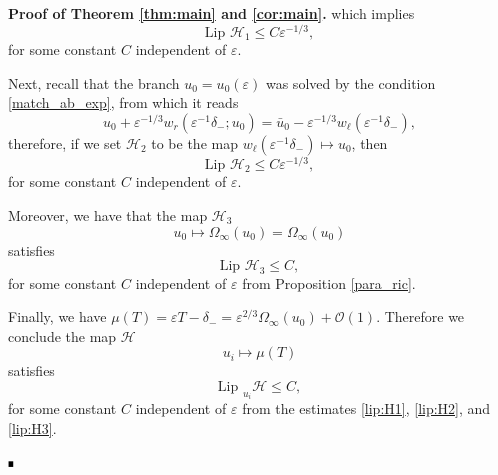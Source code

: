 \documentclass[letterpaper,11pt]{article}
\newcommand{\rmO}{\mathcal{O}}
\newcommand{\eps}{\varepsilon}
\numberwithin{equation}{section}
\theoremstyle{plain}
\newenvironment{Proof}[1][.]%
 {\begin{trivlist}\item[]\textbf{Proof#1 }}%
 {\hspace*{\fill}$\rule{0.3\baselineskip}{0.35\baselineskip}$\end{trivlist}}
\begin{document}
\begin{Proof}[\textbf{ of Theorem \ref{thm:main} and \ref{cor:main}}.]
which implies
\begin{equation}\label{lip:H1}
\text{Lip } \mathcal{H}_1 \le C\eps^{-1/3},
\end{equation}
for some constant $C$ independent of $\eps$.

Next, recall that the branch $u_0 = u_0(\eps)$ was solved by the condition \eqref{match_ab_exp}, from which it reads
\[
u_0+\eps^{-1/3}w_r(\eps^{-1}\delta_-; u_0) = \bar{u}_0 - \eps^{-1/3}w_\ell(\eps^{-1}\delta_-),
\] 
therefore, if we set $\mathcal{H}_2$ to be the map $w_{\ell}(\eps^{-1}\delta_-) \mapsto u_0$, then
\begin{equation}\label{lip:H2}
\text{Lip } \mathcal{H}_2 \le C\eps^{-1/3},
\end{equation}
for some constant $C$ independent of $\eps$.

Moreover, we have that the map $\mathcal{H}_3$ 
\begin{equation}
 u_0 \mapsto \Omega_\infty(u_0)=\Omega_\infty(u_0)
\end{equation}
satisfies
\begin{equation}\label{lip:H3} 
\text{Lip } \mathcal{H}_3 \le C, 
\end{equation}
for some constant $C$ independent of $\eps$ from Proposition \ref{para_ric}.

Finally, we have $\mu(T) = \eps T -\delta_- = \eps^{2/3}\Omega_\infty(u_0) + \rmO(1)$. Therefore we conclude the map $\mathcal{H}$
\begin{equation}
u_i \mapsto \mu(T)
\end{equation}
satisfies 
\begin{equation}
\text{Lip }_{u_i} \mathcal{H} \le C, 
\end{equation}
for some constant $C$ independent of $\eps$ from the estimates \eqref{lip:H1}, \eqref{lip:H2}, and \eqref{lip:H3}.




\end{Proof}
\end{document}
